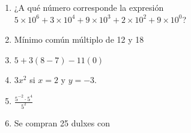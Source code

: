 \documentclass{article}
\begin{document}
\begin{enumerate}
    \item ¿A qué número corresponde la expresión \(5\times 10^6 + 3\times 10^4 + 9\times 10^3 + 2\times 10^2 + 9\times 10^0\)?
    \item Mínimo común múltiplo de 12 y 18
    \item \(5 + 3(8 - 7) - 11(0)\)
    \item \(3x^2\) si \(x = 2\) y \(y = -3\).
    \item \(\frac{5^{-2}\cdot5^4}{5^2}\)
    \item Se compran 25 dulxes con \mathdollar
\end{enumerate}
\end{document}
